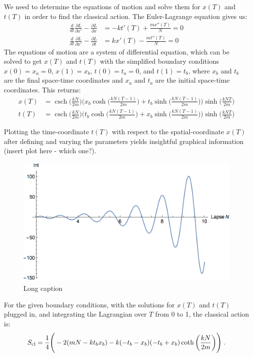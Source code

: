 \documentclass[12pt]{revtex4}
\DeclareMathOperator{\csch}{csch}
\begin{document}
We need to determine the equations of motion and solve them for $x(T)$ and $t(T)$ in order to find the classical action. The Euler-Lagrange equation gives us:
\begin{align*}
\frac{d}{dt}\frac{\partial L}{\partial x'}-\frac{\partial L}{\partial x} &= -k t'(T) + \frac{m x''(T)}{N} =0\\
\frac{d}{dt}\frac{\partial L}{\partial x'}-\frac{\partial L}{\partial t} &= k x'(T) - \frac{m t''(T)}{N} =0
\end{align*}
The equations of motion are a system of differential equation, which can be solved to get $x(T)$ and $t(T)$ with the simplified boundary conditions $x(0) = x_a = 0$, $x(1)=x_b$, $t(0) = t_a = 0$, and $t(1)=t_b$, where $x_b$ and $t_b$ are the final space-time coordinates and $x_a$ and $t_a$ are the initial space-time coordinates. This returns:
\begin{align*}
x(T) &= \csch \bigg(\frac{k N}{2 m}\bigg) \Biggr(x_b \cosh\bigg(\frac{k N (T-1)}{2m}\bigg)+ 
t_b \sinh\bigg(\frac{k N (T-1)}{2m}\bigg)\Biggr) \sinh\bigg(\frac{k N T}{2m}\bigg)\\
t(T)&= \csch \bigg(\frac{k N}{2 m}\bigg) \Biggr(t_b \cosh\bigg(\frac{k N (T-1)}{2m}\bigg)+ 
x_b \sinh\bigg(\frac{k N (T-1)}{2m}\bigg)\Biggr) \sinh\bigg(\frac{k N T}{2m}\bigg)
\end{align*} 

Plotting the time-coordinate $t(T)$ with respect to the spatial-coordinate $x(T)$ after defining and varying the parameters yields insightful graphical information (insert plot here - which one?).

\begin{figure}[h]
	\centering
	\includegraphics[width=0.7\linewidth]{integrandplot}
	\caption{Long caption}
	\label{integrandplot}
\end{figure}


For the given boundary conditions, with the solutions for $x(T)$ and $t(T)$ plugged in, and integrating the Lagrangian over $T$ from 0 to 1, the classical action  is:
\begin{equation*}
S_{\rm cl} = \frac{1}{4} \Bigg(-2 (m N - k t_b x_b) - k (-t_b - x_b) (-t_b + x_b) \coth\bigg(\frac{k N}{2 m}\bigg)\Bigg) \; .
\end{equation*} 
\end{document}
